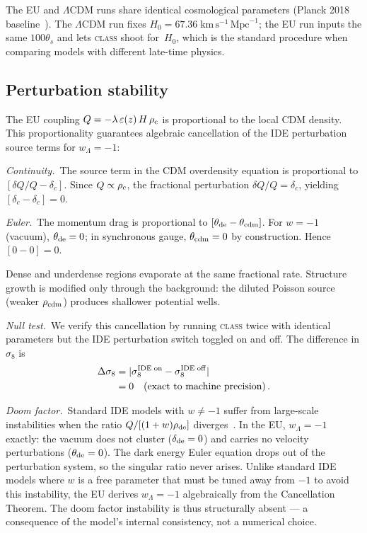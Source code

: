 \documentclass[a4paper,fleqn]{cas-dc}
\newcommand{\eps}{\varepsilon}
\newcommand{\rhoc}{\rho_{\rm c}}
\begin{document}
The EU and $\Lambda$CDM runs share identical cosmological
parameters (Planck 2018
baseline~\cite{planck2018}). The $\Lambda$CDM run
fixes $H_0 = 67.36\;\text{km}\,\text{s}^{-1}\,\text{Mpc}^{-1}$; the EU run
inputs the same $100\theta_s$ and lets \textsc{class} shoot
for~$H_0$, which is the standard procedure when comparing
models with different late-time physics.

\subsection{Perturbation stability}
\label{sec:stability}

The EU coupling $Q = -\lambda\,\eps(z)\,H\,\rhoc$ is
proportional to the local CDM density. This proportionality
guarantees algebraic cancellation of the IDE perturbation
source terms for $w_\Lambda = -1$:

\textit{Continuity.}~The source term in the CDM overdensity
equation is proportional to $[\delta Q/Q - \delta_c]$.
Since $Q \propto \rhoc$, the fractional perturbation
$\delta Q/Q = \delta_c$, yielding
$[\delta_c - \delta_c] = 0$.

\textit{Euler.}~The momentum drag is proportional to
$[\theta_{\rm de} - \theta_{\rm cdm}]$. For $w = -1$ (vacuum),
$\theta_{\rm de} = 0$; in synchronous gauge,
$\theta_{\rm cdm} = 0$ by construction. Hence
$[0 - 0] = 0$.

Dense and underdense regions evaporate at the same fractional
rate. Structure growth is modified only through the background:
the diluted Poisson source (weaker $\rho_{\rm cdm}$) produces
shallower potential wells.

\textit{Null test.}~We verify this cancellation by running
\textsc{class} twice with identical parameters but the IDE
perturbation switch toggled on and off. The difference in
$\sigma_8$ is
\begin{align}
\Delta\sigma_8
  &= |\sigma_8^{\rm IDE\;on} - \sigma_8^{\rm IDE\;off}|
  \notag \\
  &= 0\quad (\text{exact to machine precision})\,.
\label{eq:null_test}
\end{align}

\textit{Doom factor.}~Standard IDE models with $w \neq -1$
suffer from large-scale instabilities when the ratio
$Q/[(1+w)\rho_{\rm de}]$ diverges~\cite{gavela2009,valiviita2008}.
In the EU, $w_\Lambda = -1$ exactly: the vacuum does not
cluster ($\delta_{\rm de} = 0$) and carries no velocity
perturbations ($\theta_{\rm de} = 0$). The dark energy
Euler equation drops out of the perturbation system,
so the singular ratio never arises. Unlike standard IDE
models where $w$ is a free parameter that must be tuned
away from $-1$ to avoid this instability, the EU derives
$w_\Lambda = -1$ algebraically from the Cancellation
Theorem. The doom factor instability is thus structurally
absent --- a consequence of the model's internal
consistency, not a numerical choice.
\end{document}
